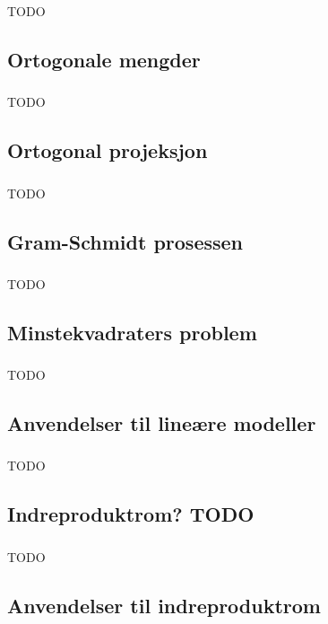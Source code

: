 \documentclass{article}
\begin{document}
      \subsubsection{}
        TODO
    \subsection{Ortogonale mengder}
      \subsubsection{}
        TODO
    \subsection{Ortogonal projeksjon}
      \subsubsection{}
        TODO
    \subsection{Gram-Schmidt prosessen}
      \subsubsection{}
        TODO
    \subsection{Minstekvadraters problem}
      \subsubsection{}
        TODO
    \subsection{Anvendelser til lineære modeller}
      \subsubsection{}
        TODO
    \subsection{Indreproduktrom? TODO}
      \subsubsection{}
        TODO
    \subsection{Anvendelser til indreproduktrom}
\end{document}
